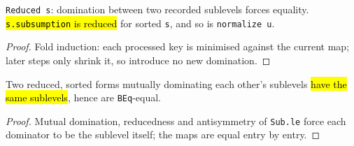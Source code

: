 \begin{theorem}
\label{thm:lvl-subsumption-reduced}
\leanok
{}
 \texttt{Reduced s}: domination between two recorded sublevels forces equality.
\hl{\texttt{s.subsumption} is reduced} for sorted \texttt{s}, and so is \texttt{normalize u}.
\end{theorem}
\begin{proof}
\leanok
{} Fold induction: each processed key is minimised against the current map; later steps only
shrink it, so introduce no new domination.
\end{proof}

\begin{theorem}
\label{thm:lvl-eq-of-hassub}
\leanok
{}
 Two reduced, sorted forms mutually dominating each other's sublevels \hl{have the same
sublevels}, hence are \texttt{BEq}-equal.
\end{theorem}
\begin{proof}
\leanok
{} Mutual domination, reducedness and antisymmetry of \texttt{Sub.le} force each dominator
to be the sublevel itself; the maps are equal entry by entry.
\end{proof}

